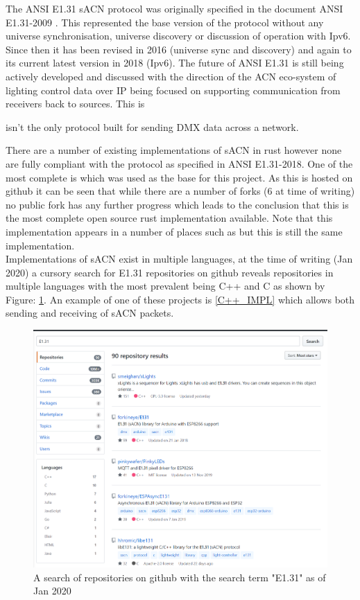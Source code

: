 \documentclass[11pt,a4paper,notitlepage]{report}
\begin{document}
	The ANSI E1.31 sACN protocol was originally specified in the document ANSI E1.31-2009 \cite{ANSI_E1.31_2009}. This represented the base version of the protocol without any universe synchronisation, universe discovery or discussion of operation with Ipv6. Since then it has been revised in 2016 (universe sync and discovery) \cite{ANSI_E1.31_2016} and again to its current latest version in 2018 (Ipv6). The future of ANSI E1.31 is still being actively developed and discussed \cite{WHAT_COMES_AFTER_SACN} with the direction of the ACN eco-system of lighting control data over IP being focused on supporting communication from receivers back to sources. This is 
	
	
	
	 isn't the only protocol built for sending DMX data across a network. 
	
	There are a number of existing implementations of sACN in rust however none are fully compliant with the protocol as specified in ANSI E1.31-2018. One of the most complete is \cite{ORIGNIAL_IMPL} which was used as the base for this project. As this is hosted on github it can be seen that while there are a number of forks (6 at time of writing) no public fork has any further progress which leads to the conclusion that this is the most complete open source rust implementation available. Note that this implementation appears in a number of places such as \cite{ORIGINAL_IMPL_RUST_DOC} but this is still the same implementation.\\
	
	Implementations of sACN exist in multiple languages, at the time of writing (Jan 2020) a cursory search for E1.31 repositories on github reveals repositories in multiple languages with the most prevalent being C++ and C as shown by Figure: \ref{E131_REPO_SEARCH}. An example of one of these projects is \ref{C++_IMPL} which allows both sending and receiving of sACN packets.
	
	\begin{figure}
		\label{E131_REPO_SEARCH}
		\includegraphics[width=\textwidth]{E131-Repo-Search}
		\caption{A search of repositories on github with the search term "E1.31" as of Jan 2020}
	\end{figure}
	
\end{document}
